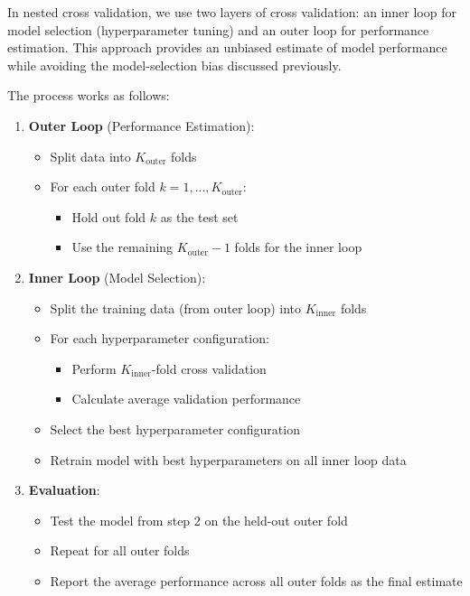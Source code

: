 In nested cross validation, we use two layers of cross validation: an inner loop for model selection (hyperparameter tuning) and an outer loop for performance estimation. This approach provides an unbiased estimate of model performance while avoiding the model-selection bias discussed previously.

The process works as follows:

\begin{enumerate}
\item \textbf{Outer Loop} (Performance Estimation):
   \begin{itemize}
   \item Split data into $K_{\mathrm{outer}}$ folds
   \item For each outer fold $k = 1, ..., K_{\mathrm{outer}}$:
     \begin{itemize}
     \item Hold out fold $k$ as the test set
     \item Use the remaining $K_{\mathrm{outer}} - 1$ folds for the inner loop
     \end{itemize}
   \end{itemize}

\item \textbf{Inner Loop} (Model Selection):
   \begin{itemize}
   \item Split the training data (from outer loop) into $K_{\mathrm{inner}}$ folds
   \item For each hyperparameter configuration:
     \begin{itemize}
     \item Perform $K_{\mathrm{inner}}$-fold cross validation
     \item Calculate average validation performance
     \end{itemize}
   \item Select the best hyperparameter configuration
   \item Retrain model with best hyperparameters on all inner loop data
   \end{itemize}

\item \textbf{Evaluation}:
   \begin{itemize}
   \item Test the model from step 2 on the held-out outer fold
   \item Repeat for all outer folds
   \item Report the average performance across all outer folds as the final estimate
   \end{itemize}
\end{enumerate}

